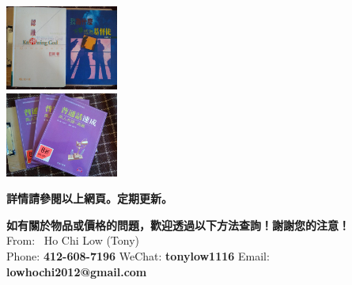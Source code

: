 \documentclass{article}[12pt]
\begin{document}
{\begin{minipage}[t][\textheight-27pt][t]{445pt}
\begin{minipage}[b]{110pt}
\end{minipage}
\begin{minipage}[b]{110pt}
\includegraphics[width=105pt]{book03_mini.jpg} \\
\includegraphics[width=105pt]{book08_mini.jpg} 
\end{minipage}
\begin{center}{\color{Plum}\bf 詳情請參閱以上網頁。定期更新。}\end{center}
\vfill
{\bf 如有關於物品或價格的問題，歡迎透過以下方法查詢！謝謝您的注意！}\\
From: \, Ho Chi Low (Tony)\\
Phone: {\bf412-608-7196} \quad WeChat: {\bf tonylow1116} \quad Email: {\bf lowhochi2012@gmail.com}\\
\mbox{ }\\
\end{minipage}}
\end{document}
